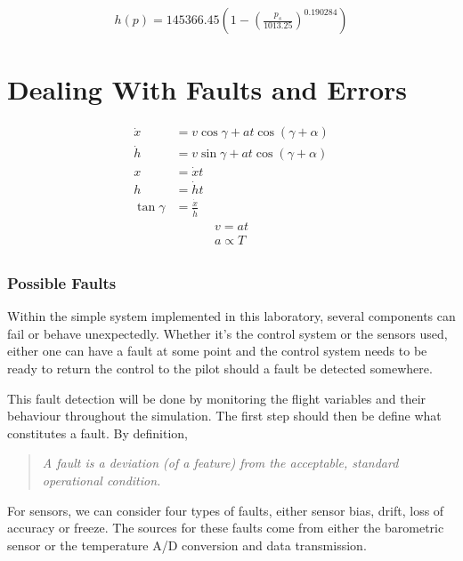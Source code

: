 \documentclass[english,palatino]{ist-report}
\begin{document}
\begin{gather*}
	h(p) = 145366.45\left(1 - \left(\frac{p_s}{1013.25}\right)^{0.190284}\right)
\end{gather*}

\part{Dealing With Faults and Errors}

\begin{align*}
	\dot{x} &= v\cos\gamma + at\cos(\gamma + \alpha) \\
	\dot{h} &= v\sin\gamma + at\cos(\gamma + \alpha) \\
	x &= \dot{x}t \\
	h &= \dot{h}t \\
	\tan\gamma &= \frac{\dot{x}}{\dot{h}}
\end{align*}
\begin{gather*}
	v = at \\
	a \propto T \\
\end{gather*}

\section{Possible Faults}

Within the simple system implemented in this laboratory, several components can fail or behave unexpectedly. Whether it's the control system or the sensors used, either one can have a fault at some point and the control system needs to be ready to return the control to the pilot should a fault be detected somewhere.

This fault detection will be done by monitoring the flight variables and their behaviour throughout the simulation. The first step should then be define what constitutes a fault. By definition,
\begin{quote} \itshape
	A fault is a deviation (of a feature) from the acceptable, standard operational condition.
\end{quote}
For sensors, we can consider four types of faults, either sensor bias, drift, loss of accuracy or freeze. The sources for these faults come from either the barometric sensor or the temperature A/D conversion and data transmission.
\listoftodos
\end{document}
